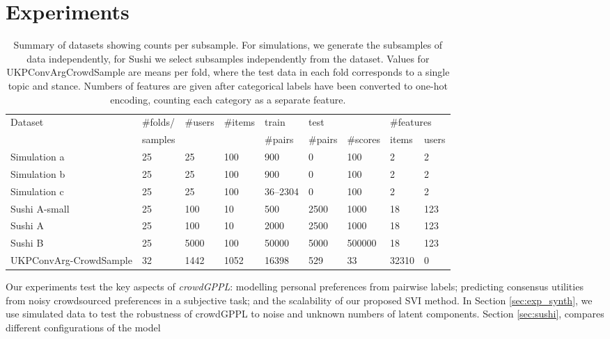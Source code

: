 \section{Experiments}\label{sec:expts}

\begin{table}[h]
\centering
\small
 \setlength{\tabcolsep}{4pt}
\begin{tabular}{p{1.8cm} l l l@{\hskip 0.4cm} l@{\hskip 0.5cm} l l@{\hskip 0.5cm} l l }
\toprule
Dataset & \#folds/ & \#users & \#items & train & \multicolumn{2}{l}{test} & \multicolumn{2}{l}{\#features} \\
              & samples &              &               & \#pairs  & \#pairs & \#scores          & items & users \\
\midrule
Simulation a & 25 & 25 & 100 & 900 & 0 & 100 & 2 & 2 \\
Simulation b & 25 & 25 & 100 & 900 & 0 & 100 & 2 & 2\\
Simulation c & 25 & 25 & 100 & 36--2304 & 0 & 100 & 2 & 2\\
\midrule
Sushi A-small & 25 & 100 & 10 & 500 & 2500 & 1000 & 18 & 123 \\
Sushi A & 25 & 100 & 10 & 2000 & 2500 & 1000 & 18 & 123 \\
Sushi B & 25 & 5000 & 100 & 50000 & 5000 & 500000 &  18 & 123 \\
\midrule
UKPConvArg-CrowdSample & 32 & 1442 & 1052 & 16398 & 529 & 33 & 32310 & 0
\\ \bottomrule
\end{tabular}
\caption{Summary of datasets showing counts per subsample. 
For simulations, we generate the subsamples of data independently, 
for Sushi we select subsamples independently from the dataset.  
Values for UKPConvArgCrowdSample are means per fold, 
where the test data in each fold corresponds to a single topic and stance. 
Numbers of features are given after categorical labels have been converted to one-hot encoding, counting
each category as a separate feature.
}
\label{tab:datasets}
\end{table}
Our experiments test the key aspects of \emph{crowdGPPL}: 
 modelling personal preferences from pairwise labels;
 predicting consensus utilities from noisy crowdsourced preferences
  in a subjective task; 
 and the scalability of our proposed SVI method.
In Section \ref{sec:exp_synth}, we use simulated data to test the robustness of crowdGPPL
to noise and unknown numbers of latent components.
Section \ref{sec:sushi}, 
compares different configurations of the model
